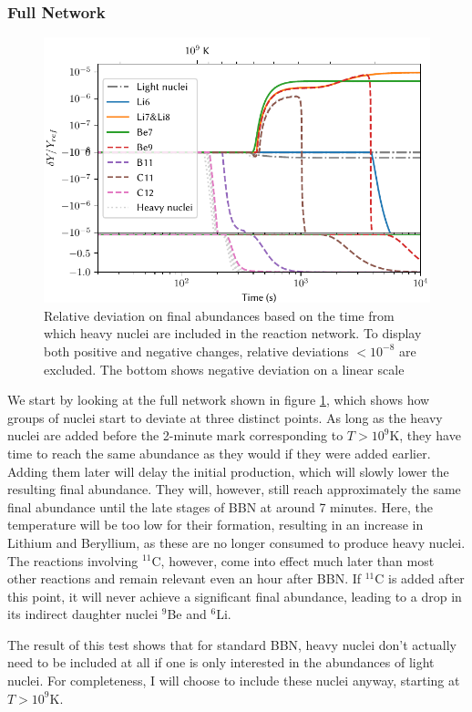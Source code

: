 \subsubsection{Full Network}
\begin{figure}[ht!]
    \includegraphics[width=5.1in]{figures/Bignettime.pdf}
    \caption{Relative deviation on final abundances based on the time from which heavy nuclei are included in the reaction network. To display both positive and negative changes, relative deviations $ <10^{-8}$ are excluded. The bottom shows negative deviation on a linear scale}
    \label{fig:bignettime}
\end{figure}
We start by looking at the full network shown in figure \ref{fig:bignettime}, which shows how groups of nuclei start to deviate at three distinct points. As long as the heavy nuclei are added before the 2-minute mark corresponding to $T>10^9$K, they have time to reach the same abundance as they would if they were added earlier. Adding them later will delay the initial production, which will slowly lower the resulting final abundance. They will, however, still reach approximately the same final abundance until the late stages of BBN at around 7 minutes. Here, the temperature will be too low for their formation, resulting in an increase in Lithium and Beryllium, as these are no longer consumed to produce heavy nuclei. 
The reactions involving ${}^{11}$C, however, come into effect much later than most other reactions and remain relevant even an hour after BBN. If ${}^{11}$C is added after this point, it will never achieve a significant final abundance, leading to a drop in its indirect daughter nuclei ${}^{9}$Be and ${}^{6}$Li. 

The result of this test shows that for standard BBN, heavy nuclei don't actually need to be included at all if one is only interested in the abundances of light nuclei. For completeness, I will choose to include these nuclei anyway, starting at $T>10^9$K. 

